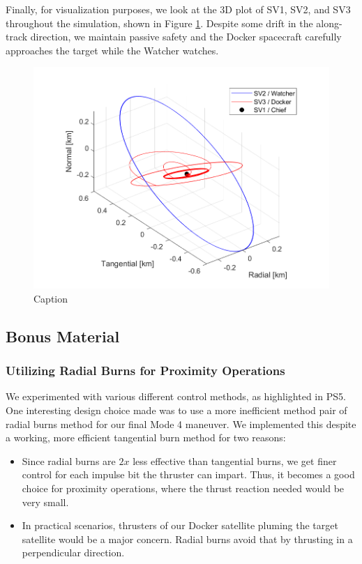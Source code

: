 Finally, for visualization purposes, we look at the 3D plot of SV1, SV2, and SV3 throughout the simulation, shown in Figure \ref{fig:3d_visual_RTN_final_control}. Despite some drift in the along-track direction, we maintain passive safety and the Docker spacecraft carefully approaches the target while the Watcher watches.

\begin{figure}[H]
    \centering
    \includegraphics[width=0.7\linewidth]{sim/figures/PS9/ROE_3d_all_maneuvers.png}
    \caption{Caption}
    \label{fig:3d_visual_RTN_final_control}
\end{figure}

\subsection{Bonus Material}
\subsubsection{Utilizing Radial Burns for Proximity Operations}
We experimented with various different control methods, as highlighted in PS5. One interesting design choice made was to use a more inefficient method pair of radial burns method for our final Mode 4 maneuver. We implemented this despite a working, more efficient tangential burn method for two reasons:
\begin{itemize}
    \item Since radial burns are $2x$ less effective than tangential burns, we get finer control for each impulse bit the thruster can impart. Thus, it becomes a good choice for proximity operations, where the thrust reaction needed would be very small.
    \item In practical scenarios, thrusters of our Docker satellite pluming the target satellite would be a major concern. Radial burns avoid that by thrusting in a perpendicular direction.
\end{itemize}

